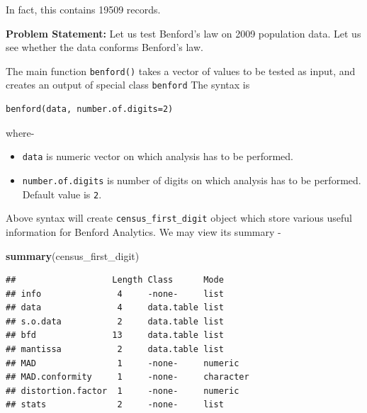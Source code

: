\documentclass[
]{book}
\newenvironment{Shaded}{\begin{snugshade}}{\end{snugshade}}
\newcommand{\AttributeTok}[1]{\textcolor[rgb]{0.13,0.29,0.53}{#1}}
\newcommand{\DecValTok}[1]{\textcolor[rgb]{0.00,0.00,0.81}{#1}}
\newcommand{\FloatTok}[1]{\textcolor[rgb]{0.00,0.00,0.81}{#1}}
\newcommand{\FunctionTok}[1]{\textcolor[rgb]{0.13,0.29,0.53}{\textbf{#1}}}
\newcommand{\NormalTok}[1]{#1}
\newcommand{\OtherTok}[1]{\textcolor[rgb]{0.56,0.35,0.01}{#1}}
\newcommand{\SpecialCharTok}[1]{\textcolor[rgb]{0.81,0.36,0.00}{\textbf{#1}}}
\providecommand{\tightlist}{%
  \setlength{\itemsep}{0pt}\setlength{\parskip}{0pt}}
\begin{document}
In fact, this contains 19509 records.

\textbf{Problem Statement:} Let us test Benford's law on 2009 population data. Let us see whether the data conforms Benford's law.

The main function \texttt{benford()} takes a vector of values to be tested as input, and creates an output of special class \texttt{benford} The syntax is

\begin{verbatim}
benford(data, number.of.digits=2)
\end{verbatim}

where-

\begin{itemize}
\tightlist
\item
  \texttt{data} is numeric vector on which analysis has to be performed.
\item
  \texttt{number.of.digits} is number of digits on which analysis has to be performed. Default value is \texttt{2}.
\end{itemize}

\begin{Shaded}
\end{Shaded}

Above syntax will create \texttt{census\_first\_digit} object which store various useful information for Benford Analytics. We may view its summary -

\begin{Shaded}
\begin{Highlighting}[]
\FunctionTok{summary}\NormalTok{(census\_first\_digit)}
\end{Highlighting}
\end{Shaded}

\begin{verbatim}
##                   Length Class      Mode     
## info               4     -none-     list     
## data               4     data.table list     
## s.o.data           2     data.table list     
## bfd               13     data.table list     
## mantissa           2     data.table list     
## MAD                1     -none-     numeric  
## MAD.conformity     1     -none-     character
## distortion.factor  1     -none-     numeric  
## stats              2     -none-     list
\end{verbatim}
\end{document}
